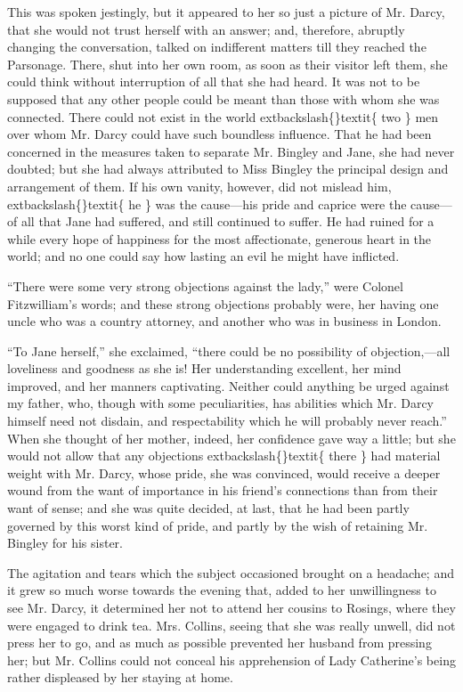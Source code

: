\documentclass[10pt]{book}
\begin{document}
   This was spoken jestingly, but it appeared to her so just a picture of
Mr. Darcy, that she would not trust herself with an answer; and,
therefore, abruptly changing the conversation, talked on indifferent
matters till they reached the Parsonage. There, shut into her own room,
as soon as their visitor left them, she could think without interruption
of all that she had heard. It was not to be supposed that any other
people could be meant than those with whom she was connected. There
could not exist in the world
   	extbackslash\{\}textit\{
    two
   \}
   men over whom Mr. Darcy could have
such boundless influence. That he had been concerned in the measures
taken to separate Mr. Bingley and Jane, she had never doubted; but she
had always attributed to Miss Bingley the principal design and
arrangement of them. If his own vanity, however, did not mislead him,
   	extbackslash\{\}textit\{
    he
   \}
   was the cause—his pride and caprice were the cause—of all that
Jane had suffered, and still continued to suffer. He had ruined for a
while every hope of happiness for the most affectionate, generous heart
in the world; and no one could say how lasting an evil he might have
inflicted.
  

   “There were some very strong objections against the lady,” were Colonel
Fitzwilliam’s words; and these strong objections probably were, her
having one uncle who was a country attorney, and another who was in
business in London.
  

   “To Jane herself,” she exclaimed, “there could be no possibility of
objection,—all loveliness and goodness as she is! Her understanding
excellent, her mind improved, and her manners captivating. Neither could
anything be urged against my father, who, though with some
peculiarities, has abilities which Mr. Darcy himself need not disdain,
and respectability which he will probably never reach.” When she thought
of her mother, indeed, her confidence gave way a little; but she would
not allow that any objections
   	extbackslash\{\}textit\{
    there
   \}
   had material weight with Mr.
Darcy, whose pride, she was convinced, would receive a deeper wound from
the want of importance in his friend’s connections than from their want
of sense; and she was quite decided, at last, that he had been partly
governed by this worst kind of pride, and partly by the wish of
retaining Mr. Bingley for his sister.
  

   The agitation and tears which the subject occasioned brought on a
headache; and it grew so much worse towards the evening that, added to
her unwillingness to see Mr. Darcy, it determined her not to attend her
cousins to Rosings, where they were engaged to drink tea. Mrs. Collins,
seeing that she was really unwell, did not press her to go, and as much
as possible prevented her husband from pressing her; but Mr. Collins
could not conceal his apprehension of Lady Catherine’s being rather
displeased by her staying at home.
  
\end{document}
